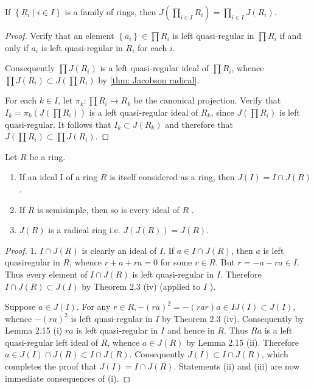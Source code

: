 \begin{theorem}
    If $\left\{R_{i} \mid i \in I\right\}$ is a family of rings, then $J\left(\prod_{i \in I} R_i\right)=\prod_{i \in I} J\left(R_i\right)$.

    \begin{proof}
        Verify that an element $\left\{a_i\right\} \in \prod R_i$ is left quasi-regular in $\prod R_i$ if and only if $a_i$ is left quasi-regular in $R_i$ for each $i$.

        Consequently $\prod J\left(R_i\right)$ is a left quasi-regular ideal of $\prod R_i$, whence $\prod J\left(R_i\right) \subset J\left(\prod R_i\right)$ by \ref{thm: Jacobson radical}.

        For each $k \in I$, let $\pi_k: \prod R_i \rightarrow R_k$ be the canonical projection. Verify that $I_k=\pi_k\left(J\left(\prod R_i\right)\right)$ is a left quasi-regular ideal of $R_k$, since $J\left(\prod R_i\right)$ is left quasi-regular. It follows that $I_k \subset J\left(R_k\right)$ and therefore that $J\left(\prod R_i\right) \subset \prod J\left(R_i\right)$.
    \end{proof}
\end{theorem}

\begin{theorem}
    Let $R$ be a ring.
    \begin{enumerate}
        \item
              If an ideal I of a ring $R$ is itself considered as a ring, then $J(I)=I \cap J(R)$.
              $\qquad$

        \item
              If $R$ is semisimple, then so is every ideal of $R$ .
        \item
              $J(R)$ is a radical ring i.e. $J\left(J\left(R\right)\right)=J\left(R\right)$.
    \end{enumerate}
    \begin{proof}
        1.
        $I \cap J(R)$ is clearly an ideal of $I$. If $a \in I \cap J(R)$, then $a$ is left quasiregular in $R$, whence $r+a+r a=0$ for some $r \in R$. But $r=-a-r a \in I$. Thus every element of $I \cap J(R)$ is left quasi-regular in $I$. Therefore $I \cap J(R) \subset J(I)$ by Theorem 2.3 (iv) (applied to $I$ ).

        Suppose $a \in J(I)$. For any $r \in R,-(r a)^2=-(r a r) a \in I J(I) \subset J(I)$, whence $-(r a)^2$ is left quasi-regular in $I$ by Theorem 2.3 (iv). Consequently by Lemma 2.15 (i) $r a$ is left quasi-regular in $I$ and hence in $R$. Thus $R a$ is a left quasi-regular left ideal of $R$, whence $a \in J(R)$ by Lemma 2.15 (ii). Therefore $a \in J(I) \cap J(R) \subset I \cap J(R)$. Consequently $J(I) \subset I \cap J(R)$, which completes the proof that $J(I)=I \cap J(R)$. Statements (ii) and (iii) are now immediate consequences of (i).
    \end{proof}
\end{theorem}

